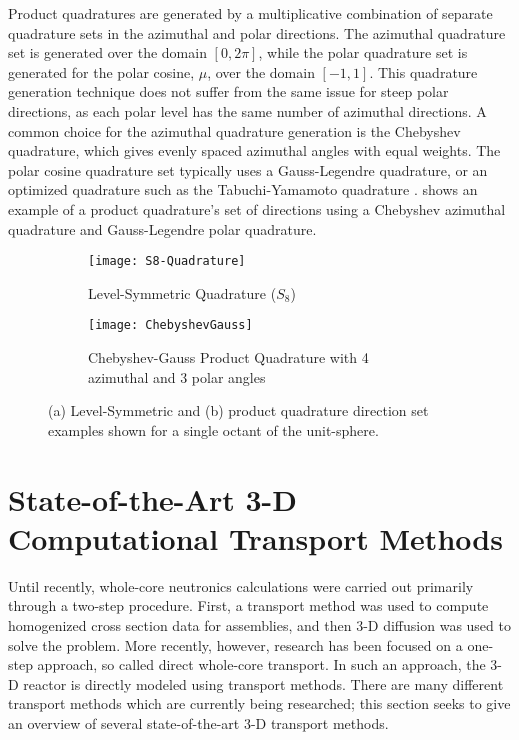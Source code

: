 {{{{{          Product quadratures are generated by a multiplicative combination of separate quadrature sets in the azimuthal and polar directions.
          The azimuthal quadrature set is generated over the domain $[0,2\pi]$, while the polar quadrature set is generated for the polar cosine, $\mu$, over the domain $[-1,1]$.
          This quadrature generation technique does not suffer from the same issue for steep polar directions, as each polar level has the same number of azimuthal directions.
          A common choice for the azimuthal quadrature generation is the Chebyshev quadrature, which gives evenly spaced azimuthal angles with equal weights.
          The polar cosine quadrature set typically uses a Gauss-Legendre quadrature, or an optimized quadrature such as the Tabuchi-Yamamoto quadrature \cite{TabuchiYamamotoQuad}.
           shows an example of a product quadrature's set of directions using a Chebyshev azimuthal quadrature and Gauss-Legendre polar quadrature.

          \begin{figure}[h]
            \centering
            \begin{subfigure}[t]{0.45\linewidth}
              \centering
              \texttt{[image: S8-Quadrature]}
              \caption{Level-Symmetric Quadrature ($S_8$)}
              \label{fig:NTT:S8 Quadrature}
            \end{subfigure}%
            \hfill
            \begin{subfigure}[t]{0.45\linewidth}
              \centering
              \texttt{[image: ChebyshevGauss]}
              \caption{Chebyshev-Gauss Product Quadrature with 4 azimuthal and 3 polar angles}
              \label{fig:NTT:ChebyshevGauss Quadrature}
            \end{subfigure}
            \caption{(a) Level-Symmetric and (b) product quadrature direction set examples shown for a single octant of the unit-sphere.}
            \label{fig:NTT:Quadrature Examples}
          \end{figure}
        }
      }
    }
  }

  \section{State-of-the-Art 3-D Computational Transport Methods}{\label{sec:NTT:3-D Transport Methods}
    Until recently, whole-core neutronics calculations were carried out primarily through a two-step procedure.
    First, a transport method was used to compute homogenized cross section data for assemblies, and then 3-D diffusion was used to solve the problem.
    More recently, however, research has been focused on a one-step approach, so called direct whole-core transport.
    In such an approach, the 3-D reactor is directly modeled using transport methods.
    There are many different transport methods which are currently being researched; this section seeks to give an overview of several state-of-the-art 3-D transport methods.

}}
